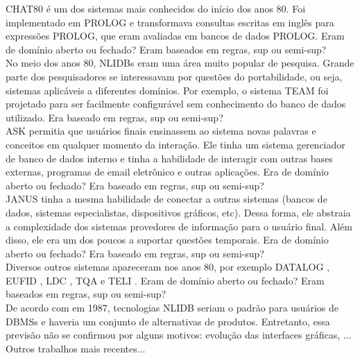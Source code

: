 \documentclass{article}
\begin{document}
CHAT80 \citep{warren1982efficient} é um dos sistemas mais conhecidos do início dos anos 80. Foi implementado em PROLOG e transformava consultas escritas em inglês para expressões PROLOG, que eram avaliadas em bancos de dados PROLOG. Eram de domínio aberto ou fechado? Eram baseados em regras, sup ou semi-sup?\\

No meio dos anos 80, NLIDBs eram uma área muito popular de pesquisa. Grande parte dos pesquisadores se interessavam por questões do portabilidade, ou seja, sistemas aplicáveis a diferentes domínios. Por exemplo, o sistema TEAM \citep{grosz1983team} foi projetado para ser facilmente configurável sem conhecimento do banco de dados utilizado. Era baseado em regras, sup ou semi-sup?\\

ASK \citep{thompson1983introducing} permitia que usuários finais ensinassem ao sistema novas palavras e conceitos em qualquer momento da interação. Ele tinha um sistema gerenciador de banco de dados interno e tinha a habilidade de interagir com outras bases externas, programas de email eletrônico e outras aplicações. Era de domínio aberto ou fechado? Era baseado em regras, sup ou semi-sup?\\

JANUS \citep{hinrichs1988tense} tinha a mesma habilidade de conectar a outras sistemas (bancos de dados, sistemas especialistas, dispositivos gráficos, etc). Dessa forma, ele abstraia a complexidade dos sistemas provedores de informação para o usuário final. Além disso, ele era um dos poucos a suportar questões temporais. Era de domínio aberto ou fechado? Era baseado em regras, sup ou semi-sup?\\

Diversos outros sistemas apareceram nos anos 80, por exemplo DATALOG \citep{hafner1984interaction}, EUFID \citep{templeton1983problems}, LDC \citep{ballard1984ldc}, TQA \citep{damerau1981operating} e TELI \citep{ballard1986semantic}. Eram de domínio aberto ou fechado? Eram baseados em regras, sup ou semi-sup?\\

De acordo com \citep{johnson1984natural} em 1987, tecnologias NLIDB seriam o padrão para usuários de DBMSs e haveria um conjunto de alternativas de produtos. Entretanto, essa previsão não se confirmou por alguns motivos: evolução das interfaces gráficas, ...\\

Outros trabalhos mais recentes...\\
\end{document}
